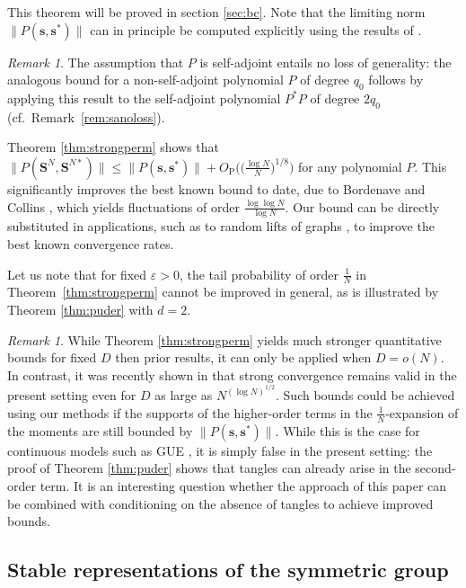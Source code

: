 \documentclass[10pt,reqno]{amsart}
\theoremstyle{definition}
\theoremstyle{remark}
\newtheorem{rem}[thm]{Remark}
\numberwithin{equation}{section}
\numberwithin{figure}{section}
\numberwithin{table}{section}
\newcommand{\Opr}{O_\mathrm{P}}
\begin{document}
This theorem will be proved in section \ref{sec:bc}. Note that the 
limiting norm $\|P(\boldsymbol{s},\boldsymbol{s}^*)\|$ can in principle be 
computed explicitly using the results of \cite{Leh99}.

\begin{rem}
The assumption that $P$ is self-adjoint entails no loss of generality: 
the analogous bound for a non-self-adjoint polynomial $P$ of degree 
$q_0$ follows by applying this result to the self-adjoint polynomial 
$P^*P$ of degree $2q_0$ (cf.\ Remark~\ref{rem:sanoloss}).
\end{rem}

Theorem \ref{thm:strongperm} shows that 
$\|P(\boldsymbol{S}^N,\boldsymbol{S}^{N*})\|\le 
\|P(\boldsymbol{s},\boldsymbol{s}^*)\|+ \Opr\big(\big(\frac{\log 
N}{N}\big)^{1/8}\big)$ for any polynomial $P$. This significantly improves 
the best known bound to date, due to Bordenave and Collins \cite[Theorem 
1.4]{BC24}, which yields fluctuations of order $\frac{\log\log N}{\log N}$.
Our bound can be directly substituted in applications, such as
to random lifts of graphs \cite[\S 1.5]{BC19}, to improve the best known 
convergence rates.

Let us note that for fixed $\varepsilon>0$, the tail probability of order 
$\frac{1}{N}$ in Theorem~\ref{thm:strongperm} cannot be improved in 
general, as is illustrated by Theorem \ref{thm:puder} with $d=2$.

\begin{rem}
While Theorem \ref{thm:strongperm} yields much stronger quantitative 
bounds for fixed $D$ then prior results, it can only be applied when 
$D=o(N)$. In contrast, it was recently shown in \cite[Corollary 1.5]{BC24} 
that strong convergence remains valid in the present setting even for $D$ 
as large as $N^{(\log N)^{1/2}}$.
Such bounds could be achieved using our methods if
the supports of 
the higher-order terms in the $\frac{1}{N}$-expansion of the moments are 
still bounded by $\|P(\boldsymbol{s},\boldsymbol{s}^*)\|$. While this is 
the case for continuous models such as GUE \cite{Par23}, it is 
simply false in the present setting: the proof of Theorem \ref{thm:puder} 
shows that tangles can already arise in the second-order term. It is an 
interesting question whether the approach of this paper can be combined 
with conditioning on the absence of tangles to achieve improved 
bounds.
\end{rem}


\subsection{Stable representations of the symmetric group}
\end{document}
